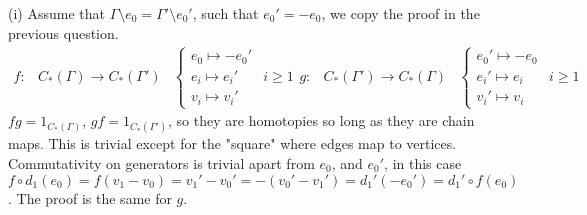 \documentclass[11pt]{article}
\theoremstyle{definition}
\begin{document}
    (i) Assume that \(\Gamma\setminus e_0 = \Gamma' \setminus e_0'\), such that \(e_0' = -e_0\), we copy the proof in the previous question.
    \begin{align*}
        f: &C_*(\Gamma) \to C_*(\Gamma')
        &\begin{cases}
            e_0 \mapsto -e_0' \\
            e_i \mapsto e_i' & i \geq 1 \\
            v_i \mapsto v_i'
        \end{cases}
        g: &C_*(\Gamma') \to C_*(\Gamma)
        &\begin{cases}
            e_0' \mapsto -e_0 \\
            e_i' \mapsto e_i & i \geq 1 \\
            v_i' \mapsto v_i
        \end{cases}
    \end{align*}
    \(fg = 1_{C_*(\Gamma)}\), \(gf = 1_{C_*(\Gamma')}\), so they are homotopies so long as they are chain maps. This is trivial except for the "square" where edges map to vertices.
    Commutativity on generators is trivial apart from \(e_0\), and \(e_0'\), in this case \(f\circ d_1(e_0) = f(v_1 - v_0) = v_1' - v_0' = -(v_0' - v_1') = d_1'(-e_0') = d_1'\circ f (e_0)\). The proof is the same for \(g\).
\end{document}
